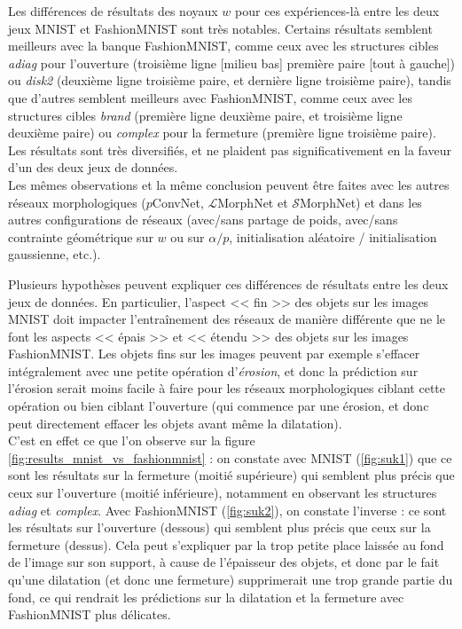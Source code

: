 \vspace{-2.4mm}
Les différences de résultats des noyaux $w$ pour ces expériences-là entre les deux jeux MNIST et FashionMNIST sont très notables. Certains résultats semblent meilleurs avec la banque FashionMNIST, comme ceux avec les structures cibles \textit{adiag} pour l'ouverture (troisième ligne [milieu bas] première paire [tout à gauche]) ou \textit{disk2} (deuxième ligne troisième paire, et dernière ligne troisième paire), tandis que d'autres semblent meilleurs avec FashionMNIST, comme ceux avec les structures cibles \textit{brand} (première ligne deuxième paire, et troisième ligne deuxième paire) ou \textit{complex} pour la fermeture (première ligne troisième paire). Les résultats sont très diversifiés, et ne plaident pas significativement en la faveur d'un des deux jeux de données. \\

\vspace{-1.0mm}
\noindent Les mêmes observations et la même conclusion peuvent être faites avec les autres réseaux morphologiques ($p$ConvNet, $\mathcal{L}$MorphNet et $\mathcal{S}$MorphNet) et dans les autres configurations de réseaux (avec/sans partage de poids, avec/sans contrainte géométrique sur $w$ ou sur $\alpha / p$, initialisation aléatoire / initialisation gaussienne, etc.).


\newpage

Plusieurs hypothèses peuvent expliquer ces différences de résultats entre les deux jeux de données. 
En particulier, l'aspect << fin >> des objets sur les images MNIST doit impacter l'entraînement des réseaux de manière différente que ne le font les aspects << épais >> et << étendu >> des objets sur les images FashionMNIST.
Les objets fins sur les images peuvent par exemple s'effacer intégralement avec une petite opération d'\textit{érosion}, et donc la prédiction sur l'érosion serait moins facile à faire pour les réseaux morphologiques ciblant cette opération ou bien ciblant l'ouverture (qui commence par une érosion, et donc peut directement effacer les objets avant même la dilatation). \\

\vspace{-1.6mm}
\noindent C'est en effet ce que l'on observe sur la figure \ref{fig:results_mnist_vs_fashionmnist} : on constate avec MNIST (\ref{fig:suk1}) que ce sont les résultats sur la fermeture (moitié supérieure) qui semblent plus précis que ceux sur l'ouverture (moitié inférieure), notamment en observant les structures \textit{adiag} et \textit{complex}. Avec FashionMNIST (\ref{fig:suk2}), on constate l'inverse : ce sont les résultats sur l'ouverture (dessous) qui semblent plus précis que ceux sur la fermeture (dessus). Cela peut s'expliquer par la trop petite place laissée au fond de l'image sur son support, à cause de l'épaisseur des objets, et donc par le fait qu'une dilatation (et donc une fermeture) supprimerait une trop grande partie du fond, ce qui rendrait les prédictions sur la dilatation et la fermeture avec FashionMNIST plus délicates.


